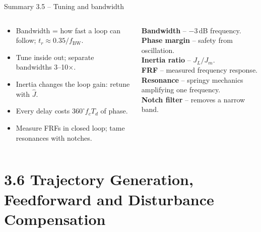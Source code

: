 \documentclass[aspectratio=169,10pt]{beamer}
\begin{document}
\begin{frame}{Summary 3.5 -- Tuning and bandwidth}
\begin{columns}[T,onlytextwidth]
\begin{keybox}
\small
\begin{itemize}
\item Bandwidth = how fast a loop can follow; $t_r\approx0.35/f_\text{BW}$.
\item Tune inside out; separate bandwidths 3--10$\times$.
\item Inertia changes the loop gain: retune with $\hat J$.
\item Every delay costs $360^\circ f_cT_d$ of phase.
\item Measure FRFs in closed loop; tame resonances with notches.
\end{itemize}
\end{keybox}
\begin{defbox}
\small
\textbf{Bandwidth} -- $-3$\,dB frequency.\\
\textbf{Phase margin} -- safety from oscillation.\\
\textbf{Inertia ratio} -- $J_L/J_m$.\\
\textbf{FRF} -- measured frequency response.\\
\textbf{Resonance} -- springy mechanics amplifying one frequency.\\
\textbf{Notch filter} -- removes a narrow band.
\end{defbox}
\end{columns}
\end{frame}

\section{3.6 Trajectory Generation, Feedforward and Disturbance Compensation}
\end{document}
